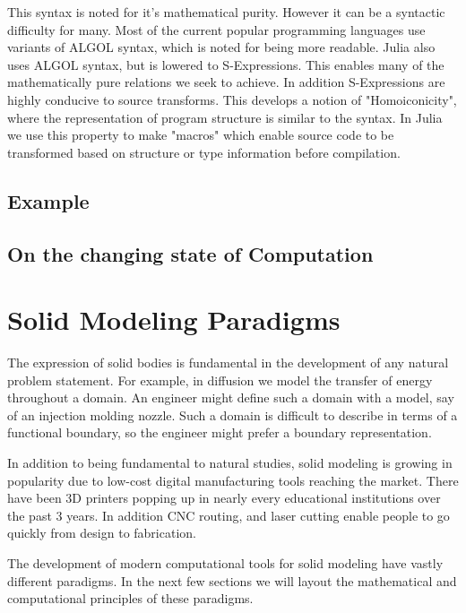 \documentclass[a4paper]{article}
\begin{document}
This syntax is noted for it's mathematical purity.
However it can be a syntactic difficulty for many.
Most of the current popular programming languages
use variants of ALGOL syntax, which is noted for being more readable.
\cite{Hoare}
Julia also uses ALGOL syntax, but is lowered to S-Expressions. This enables
many of the mathematically pure relations we seek to achieve.
In addition S-Expressions are highly conducive to source transforms.
This develops a notion of "Homoiconicity", where the representation of
program structure is similar to the syntax. In Julia we use this property
to make "macros" which enable source code to be transformed based on
structure or type information before compilation.



\subsection{Example}


\subsection{On the changing state of Computation}

\cite{Shamos_1999}

\section{Solid Modeling Paradigms}

The expression of solid bodies is fundamental in the development of any
natural problem statement. For example, in diffusion we model the transfer of
energy throughout a domain. An engineer might define such a domain with a
model, say of an injection molding nozzle. Such a domain is difficult to
describe in terms of a functional boundary, so the engineer might prefer
a boundary representation.

In addition to being fundamental to natural studies, solid modeling is growing
in popularity due to low-cost digital manufacturing tools reaching the market.
There have been 3D printers popping up in nearly every educational
institutions over the past 3 years. In addition CNC routing, and laser cutting
enable people to go quickly from design to fabrication.

The development of modern
computational tools for solid modeling have vastly different paradigms. In
the next few sections we will layout the mathematical and computational
principles of these paradigms.
\end{document}
